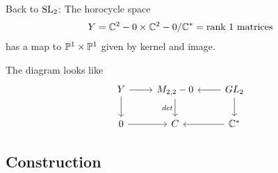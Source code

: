 \documentclass[12pt]{article}
\begin{document}
\begin{example}
    Back to $\SL_2$: The horocycle space \begin{align*}
        Y = \C^2-0 \times \C^2-0 /\C^* = \text{rank $1$ matrices}
    \end{align*} has a map to $\P^1\times \P^1$ given by kernel and image.

    The diagram looks like %
    \[\begin{tikzcd}
        Y & {M_{2,2}-0} & {GL_2} \\
        0 & C & {\mathbb{C}^*}
        \arrow[from=1-1, to=1-2]
        \arrow[from=1-1, to=2-1]
        \arrow["det"', from=1-2, to=2-2]
        \arrow[from=1-3, to=1-2]
        \arrow[from=1-3, to=2-3]
        \arrow[from=2-1, to=2-2]
        \arrow[from=2-3, to=2-2]
    \end{tikzcd}\]
\end{example}

\subsection{Construction}
\end{document}
